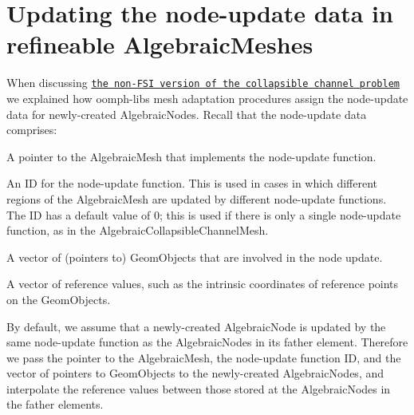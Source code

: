 \hypertarget{index_update_node_update}{}\section{Updating the node-\/update data in refineable Algebraic\+Meshes}\label{index_update_node_update}
When discussing \href{../../../navier_stokes/algebraic_collapsible_channel/html/index.html}{\tt the non-\/\+F\+SI version of the collapsible channel problem} we explained how {\ttfamily oomph-\/lib\textquotesingle{}s} mesh adaptation procedures assign the node-\/update data for newly-\/created {\ttfamily Algebraic\+Nodes}. Recall that the node-\/update data comprises\+:
\begin{DoxyItemize}
\item A pointer to the {\ttfamily Algebraic\+Mesh} that implements the node-\/update function. ~\newline
~\newline

\item An ID for the node-\/update function. This is used in cases in which different regions of the {\ttfamily Algebraic\+Mesh} are updated by different node-\/update functions. The ID has a default value of 0; this is used if there is only a single node-\/update function, as in the {\ttfamily Algebraic\+Collapsible\+Channel\+Mesh}. ~\newline
~\newline

\item A vector of (pointers to) {\ttfamily Geom\+Objects} that are involved in the node update. ~\newline
~\newline

\item A vector of reference values, such as the intrinsic coordinates of reference points on the {\ttfamily Geom\+Objects}. ~\newline
~\newline

\end{DoxyItemize}By default, we assume that a newly-\/created {\ttfamily Algebraic\+Node} is updated by the same node-\/update function as the {\ttfamily Algebraic\+Nodes} in its father element. Therefore we pass the pointer to the {\ttfamily Algebraic\+Mesh}, the node-\/update function ID, and the vector of pointers to {\ttfamily Geom\+Objects} to the newly-\/created {\ttfamily Algebraic\+Nodes}, and interpolate the reference values between those stored at the {\ttfamily Algebraic\+Nodes} in the father elements.

